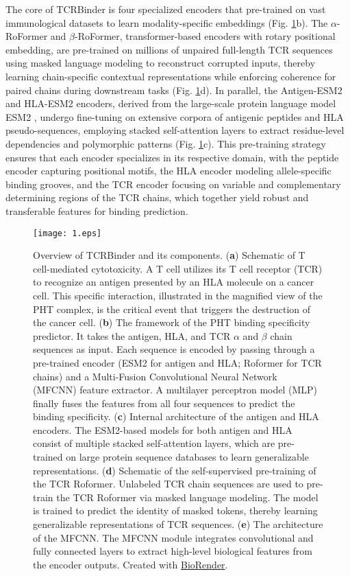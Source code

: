 \documentclass[10pt,letterpaper]{article}
\begin{document}
The core of TCRBinder is four specialized encoders that pre-trained on vast immunological datasets to learn modality-specific embeddings (Fig. \ref{fig1}b). The $\alpha$-RoFormer and $\beta$-RoFormer, transformer-based encoders with rotary positional embedding, are pre-trained on millions of unpaired full-length TCR sequences using masked language modeling to reconstruct corrupted inputs, thereby learning chain-specific contextual representations while enforcing coherence for paired chains during downstream tasks (Fig. \ref{fig1}d). In parallel, the Antigen-ESM2 and HLA-ESM2 encoders, derived from the large-scale protein language model ESM2 \cite{ref36}, undergo fine-tuning on extensive corpora of antigenic peptides and HLA pseudo-sequences, employing stacked self-attention layers to extract residue-level dependencies and polymorphic patterns (Fig. \ref{fig1}c). This pre-training strategy ensures that each encoder specializes in its respective domain, with the peptide encoder capturing positional motifs, the HLA encoder modeling allele-specific binding grooves, and the TCR encoder focusing on variable and complementary determining regions of the TCR chains, which together yield robust and transferable features for binding prediction.

\begin{figure}[!h]
    \texttt{[image: 1.eps]}
    \caption{Overview of TCRBinder and its components. (\textbf{a}) Schematic of T cell-mediated cytotoxicity. A T cell utilizes its T cell receptor (TCR) to recognize an antigen presented by an HLA molecule on a cancer cell. This specific interaction, illustrated in the magnified view of the PHT complex, is the critical event that triggers the destruction of the cancer cell. (\textbf{b}) The framework of the PHT binding specificity predictor. It takes the antigen, HLA, and TCR $\alpha$ and $\beta$ chain sequences as input. Each sequence is encoded by passing through a pre-trained encoder (ESM2 for antigen and HLA; Roformer for TCR chains) and a Multi-Fusion Convolutional Neural Network (MFCNN) feature extractor. A multilayer perceptron model (MLP) finally fuses the features from all four sequences to predict the binding specificity. (\textbf{c}) Internal architecture of the antigen and HLA encoders. The ESM2-based models for both antigen and HLA consist of multiple stacked self-attention layers, which are pre-trained on large protein sequence databases to learn generalizable representations. (\textbf{d}) Schematic of the self-supervised pre-training of the TCR Roformer. Unlabeled TCR chain sequences are used to pre-train the TCR Roformer via masked language modeling. The model is trained to predict the identity of masked tokens, thereby learning generalizable representations of TCR sequences. (\textbf{e}) The architecture of the MFCNN. The MFCNN module integrates convolutional and fully connected layers to extract high-level biological features from the encoder outputs. Created with \href{https://app.biorender.com}{BioRender}.}
\label{fig1}
\end{figure}
\end{document}
